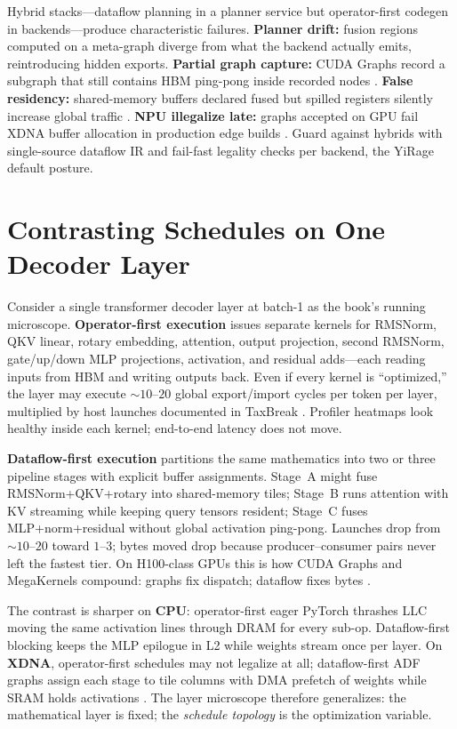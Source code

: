 Hybrid stacks---dataflow planning in a planner service but operator-first codegen in backends---produce characteristic failures.
\textbf{Planner drift:} fusion regions computed on a meta-graph diverge from what the backend actually emits, reintroducing hidden exports.
\textbf{Partial graph capture:} CUDA Graphs record a subgraph that still contains HBM ping-pong inside recorded nodes \citep{nvidia2024cudagraphs}.
\textbf{False residency:} shared-memory buffers declared fused but spilled registers silently increase global traffic \citep{nvidia2022hopper}.
\textbf{NPU illegalize late:} graphs accepted on GPU fail XDNA buffer allocation in production edge builds \citep{amd2024aie}.
Guard against hybrids with single-source dataflow IR and fail-fast legality checks per backend, the YiRage default posture.

\section{Contrasting Schedules on One Decoder Layer}
\label{sec:layer_contrast}

Consider a single transformer decoder layer at batch-1 as the book's running microscope.
\textbf{Operator-first execution} issues separate kernels for RMSNorm, QKV linear, rotary embedding, attention, output projection, second RMSNorm, gate/up/down MLP projections, activation, and residual adds---each reading inputs from HBM and writing outputs back.
Even if every kernel is ``optimized,'' the layer may execute ${\sim}10$--$20$ global export/import cycles per token per layer, multiplied by host launches documented in TaxBreak \citep{taxbreak2026}.
Profiler heatmaps look healthy inside each kernel; end-to-end latency does not move.

\textbf{Dataflow-first execution} partitions the same mathematics into two or three pipeline stages with explicit buffer assignments.
Stage~A might fuse RMSNorm+QKV+rotary into shared-memory tiles; Stage~B runs attention with KV streaming while keeping query tensors resident; Stage~C fuses MLP+norm+residual without global activation ping-pong.
Launches drop from ${\sim}10$--$20$ toward $1$--$3$; bytes moved drop because producer--consumer pairs never left the fastest tier.
On H100-class GPUs this is how CUDA Graphs and MegaKernels compound: graphs fix dispatch; dataflow fixes bytes \citep{nvidia2024cudagraphs,memoryfloor2026}.

The contrast is sharper on \textbf{CPU}: operator-first eager PyTorch thrashes LLC moving the same activation lines through DRAM for every sub-op.
Dataflow-first blocking keeps the MLP epilogue in L2 while weights stream once per layer.
On \textbf{XDNA}, operator-first schedules may not legalize at all; dataflow-first ADF graphs assign each stage to tile columns with DMA prefetch of weights while SRAM holds activations \citep{amd2024xdna,amd2024aie}.
The layer microscope therefore generalizes: the mathematical layer is fixed; the \emph{schedule topology} is the optimization variable.

